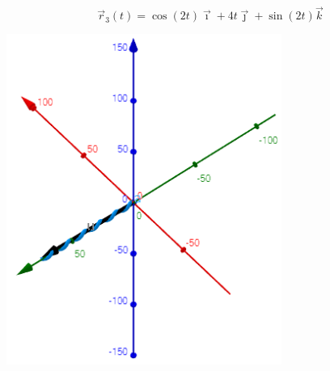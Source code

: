 \documentclass[letterpaper, 12pt]{article}
\begin{document}
\[\vec{r}_3(t)=\cos (2t) \vec{\imath}+4t\vec{\jmath}+\sin (2t)\vec{k}\]
\begin{center}
    \includegraphics[width=9cm]{grafica3.PNG}
\end{center}
\end{document}
